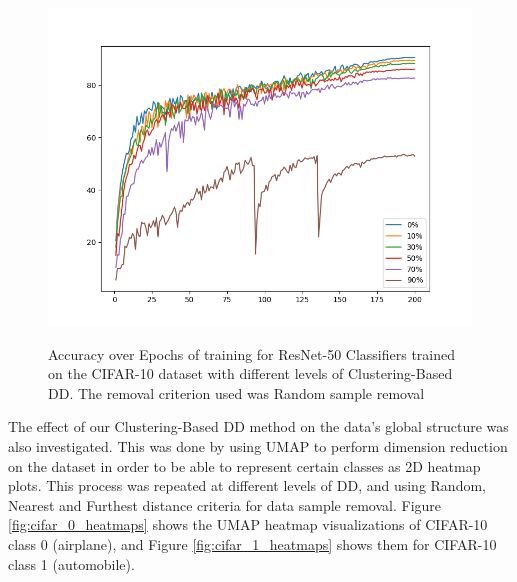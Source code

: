 \begin{figure}
    \centering
    \caption[Accuracy on CIFAR-10 using random sample removal]{Accuracy over Epochs of training for ResNet-50 Classifiers trained on the CIFAR-10 dataset with different levels of Clustering-Based DD. The removal criterion used was Random sample removal}
    \includegraphics[width=1\linewidth]{fig_datadistill/cifar_results_random.png}
    \label{fig:cifar_results_random}
\end{figure}

The effect of our Clustering-Based DD method on the data's global structure was also investigated. This was done by using UMAP \cite{mcinnes2018umap} to perform dimension reduction on the dataset in order to be able to represent certain classes as 2D heatmap plots. This process was repeated at different levels of DD, and using Random, Nearest and Furthest distance criteria for data sample removal. Figure \ref{fig:cifar_0_heatmaps} shows the UMAP heatmap visualizations of CIFAR-10 class 0 (airplane), and Figure \ref{fig:cifar_1_heatmaps} shows them for CIFAR-10 class 1 (automobile). 


